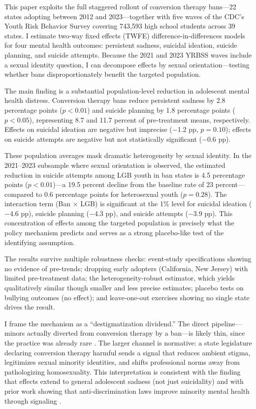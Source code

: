 \documentclass[12pt]{article}
\begin{document}
This paper exploits the full staggered rollout of conversion therapy bans---22 states adopting between 2012 and 2023---together with five waves of the CDC's Youth Risk Behavior Survey covering 743,593 high school students across 39 states. I estimate two-way fixed effects (TWFE) difference-in-differences models for four mental health outcomes: persistent sadness, suicidal ideation, suicide planning, and suicide attempts. Because the 2021 and 2023 YRBSS waves include a sexual identity question, I can decompose effects by sexual orientation---testing whether bans disproportionately benefit the targeted population.

The main finding is a substantial population-level reduction in adolescent mental health distress. Conversion therapy bans reduce persistent sadness by 2.8 percentage points ($p < 0.01$) and suicide planning by 1.8 percentage points ($p < 0.05$), representing 8.7 and 11.7 percent of pre-treatment means, respectively. Effects on suicidal ideation are negative but imprecise ($-$1.2 pp, $p = 0.10$); effects on suicide attempts are negative but not statistically significant ($-$0.6 pp).

These population averages mask dramatic heterogeneity by sexual identity. In the 2021--2023 subsample where sexual orientation is observed, the estimated reduction in suicide attempts among LGB youth in ban states is 4.5 percentage points ($p < 0.01$)---a 19.5 percent decline from the baseline rate of 23 percent---compared to 0.6 percentage points for heterosexual youth ($p = 0.28$). The interaction term (Ban $\times$ LGB) is significant at the 1\% level for suicidal ideation ($-$4.6 pp), suicide planning ($-$4.3 pp), and suicide attempts ($-$3.9 pp). This concentration of effects among the targeted population is precisely what the policy mechanism predicts and serves as a strong placebo-like test of the identifying assumption.

The results survive multiple robustness checks: event-study specifications showing no evidence of pre-trends; dropping early adopters (California, New Jersey) with limited pre-treatment data; the \citet{callaway2021} heterogeneity-robust estimator, which yields qualitatively similar though smaller and less precise estimates; placebo tests on bullying outcomes (no effect); and leave-one-out exercises showing no single state drives the result.

I frame the mechanism as a ``destigmatization dividend.'' The direct pipeline---minors actually diverted from conversion therapy by a ban---is likely thin, since the practice was already rare \citep{blosnich2018}. The larger channel is normative: a state legislature declaring conversion therapy harmful sends a signal that reduces ambient stigma, legitimizes sexual minority identities, and shifts professional norms away from pathologizing homosexuality. This interpretation is consistent with the finding that effects extend to general adolescent sadness (not just suicidality) and with prior work showing that anti-discrimination laws improve minority mental health through signaling \citep{hatzenbuehler2014,raifman2017}.
\end{document}
